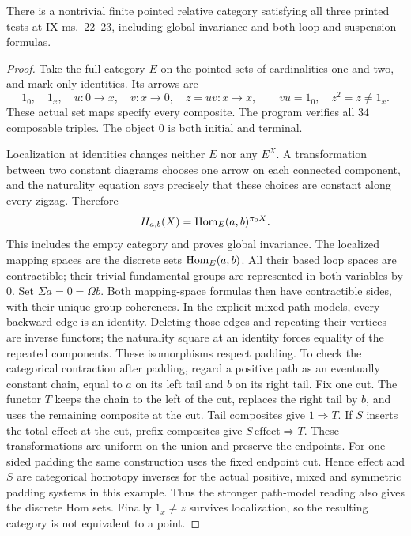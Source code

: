 \begin{proposition}\label{F:C26-finite}
There is a nontrivial finite pointed relative category satisfying all
three printed tests at IX ms.~22--23, including global invariance and
both loop and suspension formulas.
\end{proposition}
\begin{proof}
Take the full category $E$ on the pointed sets of cardinalities one and
two, and mark only identities. Its arrows are
\[
 1_0,\quad 1_x,\quad u:0\to x,\quad v:x\to0,\quad z=uv:x\to x,
 \qquad vu=1_0,\quad z^2=z\ne1_x.
\]
These actual set maps specify every composite. The program verifies all
$34$ composable triples. The object $0$ is both initial and terminal.

Localization at identities changes neither $E$ nor any $E^X$.
A transformation between two constant diagrams chooses one arrow on
each connected component, and the naturality equation says precisely
that these choices are constant along every zigzag. Therefore
\[
 H_{a,b}(X)=\operatorname{Hom}_E(a,b)^{\pi_0X}.
\]
This includes the empty category and proves global invariance. The
localized mapping spaces are the discrete sets $\operatorname{Hom}_E(a,b)$.
All their based loop spaces are contractible; their trivial fundamental
groups are represented in both variables by $0$. Set
$\Sigma a=0=\Omega b$. Both mapping-space formulas then have contractible
sides, with their unique group coherences. In the explicit mixed path
models, every backward edge is an identity. Deleting those edges and
repeating their vertices are inverse functors; the naturality square at
an identity forces equality of the repeated components. These
isomorphisms respect padding. To check the categorical contraction
after padding, regard a positive path as an eventually constant chain,
equal to $a$ on its left tail and $b$ on its right tail. Fix one cut.
The functor $T$ keeps the chain to the left of the cut, replaces the
right tail by $b$, and uses the remaining composite at the cut.
Tail composites give $1\Rightarrow T$. If $S$ inserts the total effect
at the cut, prefix composites give $S\,\mathrm{effect}\Rightarrow T$.
These transformations are uniform on the union and preserve the
endpoints. For one-sided padding the same construction uses the fixed
endpoint cut. Hence effect and $S$ are categorical homotopy inverses
for the actual positive, mixed and symmetric padding systems in this
example. Thus the stronger path-model reading also gives the discrete
Hom sets. Finally $1_x\ne z$ survives
localization, so the resulting category is not equivalent to a point.
\end{proof}

